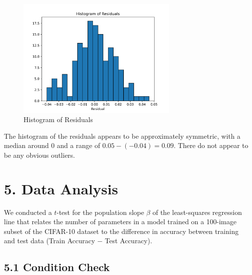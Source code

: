 \documentclass[12pt]{article}
\begin{document}
    \begin{figure}[H]
        \centering
        \includegraphics[width=0.7\textwidth]{Images/Resid Hist}
        \caption{Histogram of Residuals}
        \label{fig:residual_hist}
    \end{figure}
    \noindent The histogram of the residuals appears to be approximately symmetric, with a median around 0 and a range of
    $0.05-(-0.04)=0.09$. There do not appear to be any obvious outliers.

    \section*{5. Data Analysis}

    We conducted a $t$-test for the population slope $\beta$ of the least-squares regression line that relates the number of parameters in a model trained on a 100-image subset of the CIFAR-10 dataset to the difference in accuracy between training and test data (Train Accuracy $-$ Test Accuracy).

    \subsection*{5.1 Condition Check}
\end{document}

